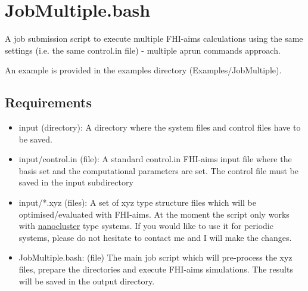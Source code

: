 \documentclass[12pt]{article}
\begin{document}
\section{JobMultiple.bash}

\noindent  A job submission script to execute multiple FHI-aims calculations using the same settings (i.e. the same control.in file) - multiple aprun commands approach.

\noindent  An example is provided in the examples directory (Examples/JobMultiple).

\subsection{Requirements}

\begin{itemize}

  \item input (directory):
  A directory where the system files and control files have to be saved.
  
  \item input/control.in (file):
  A standard control.in FHI-aims input file where the basis set and the computational parameters are set. The control file must be saved in the input subdirectory
  
  \item input/*.xyz (files):
  A set of xyz type structure files which will be optimised/evaluated with FHI-aims. At the moment the script only works with \underline{nanocluster} type systems. If you would like to use it for periodic systems, please do not hesitate to contact me and I will make the changes.
  
  \item JobMultiple.bash: (file)
  The main job script which will pre-process the xyz files, prepare the directories and execute FHI-aims simulations. The results will be saved in the output directory. 
   
\end{itemize}
\end{document}

